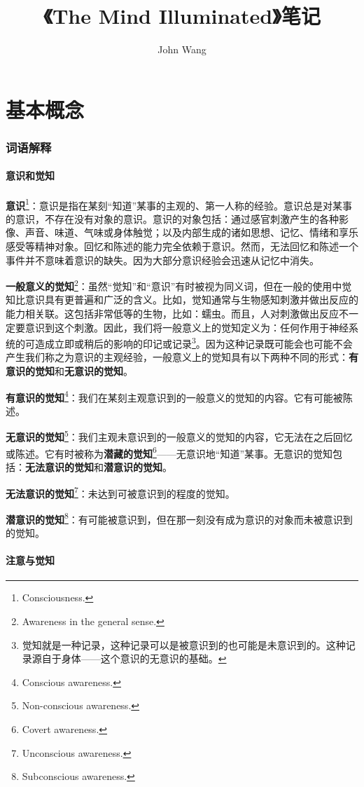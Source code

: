 \documentclass{ctexart}
\def\dfn#1{\textbf{#1}}
\def\dfnb#1#2{\textbf{#1}\footnote{#2.}}
\begin{document}
    \title{《The Mind Illuminated》笔记}
    \author{John Wang}
    \date{}
    \maketitle
    \tableofcontents

\part{基本概念}
    \section{词语解释}

    \subsection{意识和觉知}

    \dfnb{意识}{Consciousness}：意识是指在某刻“知道”某事的主观的、第一人称的经验。意识总是对某事的意识，不存在没有对象的意识。意识的对象包括：通过感官刺激产生的各种影像、声音、味道、气味或身体触觉；以及内部生成的诸如思想、记忆、情绪和享乐感受等精神对象。回忆和陈述的能力完全依赖于意识。然而，无法回忆和陈述一个事件并不意味着意识的缺失。因为大部分意识经验会迅速从记忆中消失。

    \dfnb{一般意义的觉知}{Awareness in the general sense}：虽然“觉知”和“意识”有时被视为同义词，但在一般的使用中觉知比意识具有更普遍和广泛的含义。比如，觉知通常与生物感知刺激并做出反应的能力相关联。这包括非常低等的生物，比如：蠕虫。而且，人对刺激做出反应不一定要意识到这个刺激。因此，我们将一般意义上的觉知定义为：任何作用于神经系统的可造成立即或稍后的影响的印记或记录\footnote{觉知就是一种记录，这种记录可以是被意识到的也可能是未意识到的。这种记录源自于身体——这个意识的无意识的基础。}。因为这种记录既可能会也可能不会产生我们称之为意识的主观经验，一般意义上的觉知具有以下两种不同的形式：\dfn{有意识的觉知}和\dfn{无意识的觉知}。

    \dfnb{有意识的觉知}{Conscious awareness}：我们在某刻主观意识到的一般意义的觉知的内容。它有可能被陈述。

    \dfnb{无意识的觉知}{Non-conscious awareness}：我们主观未意识到的一般意义的觉知的内容，它无法在之后回忆或陈述。它有时被称为\dfnb{潜藏的觉知}{Covert awareness}——无意识地“知道”某事。无意识的觉知包括：\dfn{无法意识的觉知}和\dfn{潜意识的觉知}。

    \dfnb{无法意识的觉知}{Unconscious awareness}：未达到可被意识到的程度的觉知。

    \dfnb{潜意识的觉知}{Subconscious awareness}：有可能被意识到，但在那一刻没有成为意识的对象而未被意识到的觉知。

    \subsection{注意与觉知}
\end{document}
